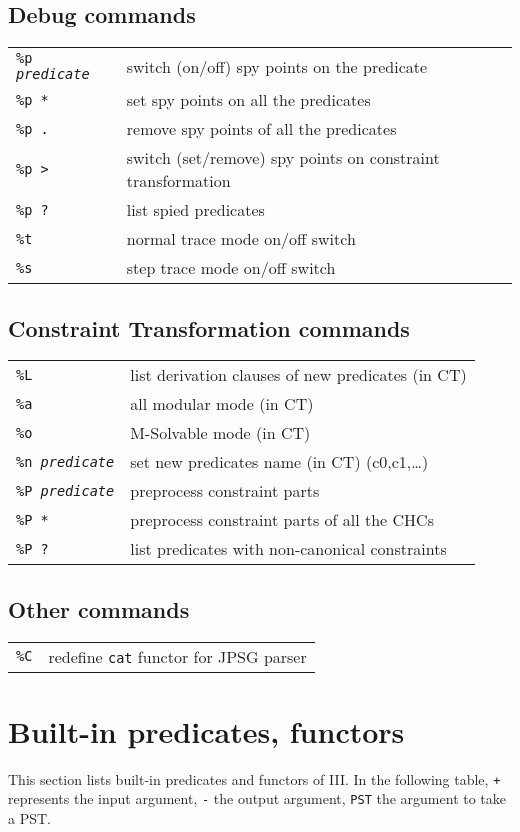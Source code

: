 \subsection{Debug commands}
\begin{tabular}{ll}
{\tt \%p {\em predicate}} & switch (on/off) spy points on the predicate\\
{\tt \%p *} 		& set spy points on all the predicates	\\
{\tt \%p .}	& remove spy points of all the predicates\\
{\tt \%p >}	& switch (set/remove) spy points on constraint
transformation\\
{\tt \%p ?}	& list spied predicates\\
{\tt \%t}	& normal trace mode on/off switch\\
{\tt \%s}	& step trace mode on/off switch\\
\end{tabular}

\subsection{Constraint Transformation commands}
\begin{tabular}{ll}
{\tt \%L}	& list derivation clauses of new predicates (in CT)\\
{\tt \%a}	& all modular mode (in CT) \\
{\tt \%o}	& M-Solvable mode (in CT) \\
{\tt \%n {\em predicate}} & 
	set new predicates name (in CT) (c0,c1,\ldots) \\
{\tt \%P {\em predicate}} & preprocess constraint parts\\
{\tt \%P *} & preprocess constraint parts of all the CHCs\\
{\tt \%P ?} & list predicates with non-canonical constraints\\
\end{tabular}

\subsection{Other commands}
\begin{tabular}{ll}
{\tt \%C}	& redefine {\tt cat} functor for JPSG parser
\end{tabular}

\section{Built-in predicates, functors}
This section lists built-in predicates and functors of \cuprolog III.
In the following table, {\tt +} represents the input argument, 
{\tt -} the output argument, {\tt PST} the argument to take a PST. 

